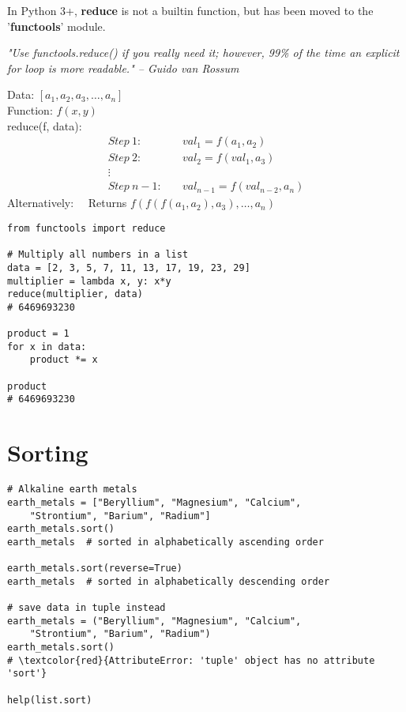 \documentclass{beamer}
\begin{document}
\begin{frame}[fragile]{}
In Python 3+, \textbf{reduce} is not a builtin function, but has been
moved to the '\textbf{functools}' module.\par \vspace{5pt}
\textit{"Use functools.reduce() if you really need it; however, 99\% of the 
time an explicit for loop is more readable." -- Guido van Rossum}\par \vspace{10pt}
Data: $[a_1, a_2, a_3, \dots, a_n]$\\
Function: $f(x, y)$\\
reduce(f, data):
\begin{align*}
Step\ 1:\quad   &val_1=f(a_1, a_2)\\
Step\ 2:\quad   &val_2=f(val_1, a_3)\\
\vdots\\
Step\ n-1:\quad &val_{n-1}=f(val_{n-2}, a_n)
\end{align*}
Alternatively:
\ \ Returns $f(f(f(a_1, a_2), a_3),\dots,a_n)$
\end{frame}

\begin{frame}[fragile]{}
\begin{verbatim}
from functools import reduce

# Multiply all numbers in a list
data = [2, 3, 5, 7, 11, 13, 17, 19, 23, 29]
multiplier = lambda x, y: x*y
reduce(multiplier, data)
# 6469693230

product = 1
for x in data:
    product *= x

product
# 6469693230
\end{verbatim}
\end{frame}

\section{Sorting}

\begin{frame}[fragile]{}
\begin{verbatim}
# Alkaline earth metals
earth_metals = ["Beryllium", "Magnesium", "Calcium",
    "Strontium", "Barium", "Radium"]
earth_metals.sort()
earth_metals  # sorted in alphabetically ascending order

earth_metals.sort(reverse=True)
earth_metals  # sorted in alphabetically descending order

# save data in tuple instead
earth_metals = ("Beryllium", "Magnesium", "Calcium",
    "Strontium", "Barium", "Radium")
earth_metals.sort()
# \textcolor{red}{AttributeError: 'tuple' object has no attribute 'sort'}

help(list.sort)
\end{verbatim}
\end{frame}
\end{document}
